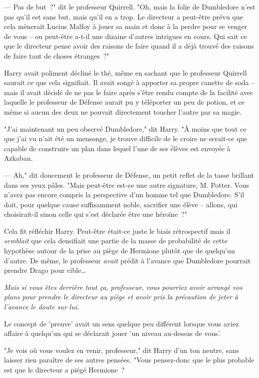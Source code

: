 --- Pas de but~?" dit le professeur Quirrell. "Oh, mais la folie de Dumbledore n'est pas qu'il est sans but, mais qu'il en a trop. Le directeur a peut-être prévu que cela mènerait Lucius Malfoy à jouer sa main et donc à la perdre pour se venger de vous -- ou peut-être a-t-il une dizaine d'autres intrigues en cours. Qui sait ce que le directeur pense avoir des raisons de faire quand il a déjà trouvé des raisons de faire tant de choses étranges~?"

Harry avait poliment décliné le thé, même en sachant que le professeur Quirrell saurait ce que cela signifiait. Il avait songé à apporter sa propre canette de soda -- mais il avait décidé de ne pas le faire après s'être rendu compte de la facilité avec laquelle le professeur de Défense aurait pu y téléporter un peu de potion, et ce même si aucun des deux ne pouvait directement toucher l'autre par sa magie.

"J'ai maintenant un peu observé Dumbledore," dit Harry. "À moins que tout ce que j'ai vu n'ait été un mensonge, je trouve difficile de le croire ne serait-ce que capable de construire un plan dans lequel l'une de ses élèves est envoyée à Azkaban.

--- Ah," dit doucement le professeur de Défense, un petit reflet de la tasse brillant dans ses yeux pâles. "Mais peut-être est-ce une autre signature, M. Potter. Vous n'avez pas encore compris la perspective d'un homme tel que Dumbledore. S'il doit, pour quelque cause suffisamment noble, sacrifier une élève -- allons, qui choisirait-il sinon celle qui s'est déclarée être une héroïne~?"

Cela fit réfléchir Harry. Peut-être était-ce juste le biais rétrospectif mais il \emph{semblait} que cela densifiait une partie de la masse de probabilité de cette hypothèse autour de la prise au piège de Hermione plutôt que de quelqu'un d'autre. De même, le professeur \emph{avait} prédit à l'avance que Dumbledore pourrait prendre Drago pour cible…

\emph{Mais si vous êtes derrière tout ça, professeur, vous pourriez avoir arrangé vos plans pour prendre le directeur au piège et avoir pris la précaution de jeter à l'avance le doute sur lui.}

Le concept de 'preuve' avait un sens quelque peu différent lorsque vous aviez affaire à quelqu'un qui se déclarait jouer 'un niveau au-dessus de vous'.

"Je vois où vous voulez en venir, professeur," dit Harry d'un ton neutre, sans laisser rien paraître de ses autres pensées. "Vous pensez-donc que le plus probable est que le directeur a piégé Hermione~?

